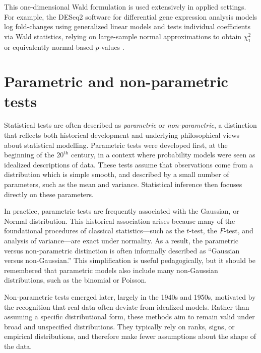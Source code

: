 \medskip

This one-dimensional Wald formulation is used extensively in applied settings. For example, the \textsf{DESeq2} software for differential gene expression analysis models log fold-changes using generalized linear models and tests individual coefficients via Wald statistics, relying on large-sample normal approximations to obtain \(\chi^2_1\) or equivalently normal-based \(p\)-values \cite{love_2014_deseq2}.

\section{Parametric and non-parametric tests}

Statistical tests are often described as \emph{parametric} or \emph{non-parametric}, a distinction that reflects both historical development and underlying philosophical views about statistical modelling. Parametric tests were developed first, at the beginning of the $20^{\text{th}}$ century, in a context where probability models were seen as idealized descriptions of data. These tests assume that observations come from a distribution which is simple smooth, and described by a small number of parameters, such as the mean and variance. Statistical inference then focuses directly on these parameters.

\medskip

In practice, parametric tests are frequently associated with the Gaussian, or Normal distribution. This historical association arises because many of the foundational procedures of classical statistics—such as the \(t\)-test, the \(F\)-test, and analysis of variance—are exact under normality. As a result, the parametric versus non-parametric distinction is often informally described as “Gaussian versus non-Gaussian.”  This simplification is useful pedagogically, but it should be remembered that parametric models also include many non-Gaussian distributions, such as the binomial or Poisson.

\medskip

Non-parametric tests emerged later, largely in the 1940s and 1950s, motivated by the recognition that real data often deviate from idealized models. Rather than assuming a specific distributional form, these methods aim to remain valid under broad and unspecified distributions.  They typically rely on ranks, signs, or empirical distributions, and therefore make fewer assumptions about the shape of the data.

